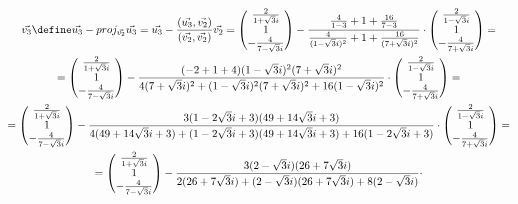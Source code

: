 \begin{multline*}
    \vec{v_3} \define \vec{u_3} - proj_{\vec{v_2}}\vec{u_3} = \vec{u_3} - \frac{(\vec{u_3}, \vec{v_2})}{(\vec{v_2}, \vec{v_2})}\vec{v_2} =
    \begin{pmatrix}
        \frac2{1 + \sqrt3i} \\
        1 \\
        -\frac4{7 - \sqrt3i}
    \end{pmatrix} - \frac{\frac4{1 - 3} + 1 + \frac{16}{7 - 3}}{\frac4{(1 - \sqrt3i)^2} + 1 + \frac{16}{(7 + \sqrt3i)^2}} \cdot
    \begin{pmatrix}
        \frac2{1 - \sqrt3i} \\
        1 \\
        -\frac4{7 + \sqrt3i}
    \end{pmatrix} = \\
    =
    \begin{pmatrix}
        \frac2{1 + \sqrt3i} \\
        1 \\
        -\frac4{7 - \sqrt3i}
    \end{pmatrix} - \frac{(-2 + 1 + 4)(1 - \sqrt3i)^2(7 + \sqrt3i)^2}{4(7 + \sqrt3i)^2 + (1 - \sqrt3i)^2(7 + \sqrt3i)^2 + 16(1 - \sqrt3i)^2} \cdot
    \begin{pmatrix}
        \frac2{1 - \sqrt3i} \\
        1 \\
        -\frac4{7 + \sqrt3i}
    \end{pmatrix} = \\
    =
    \begin{pmatrix}
        \frac2{1 + \sqrt3i} \\
        1 \\
        -\frac4{7 - \sqrt3i}
    \end{pmatrix} - \frac{3(1 - 2\sqrt3i + 3)(49 + 14\sqrt3i + 3)}{4(49 + 14\sqrt3i + 3) + (1 - 2\sqrt3i + 3)(49 + 14\sqrt3i + 3) + 16(1 - 2\sqrt3i + 3)} \cdot
    \begin{pmatrix}
        \frac2{1 - \sqrt3i} \\
        1 \\
        -\frac4{7 + \sqrt3i}
    \end{pmatrix} = \\
    =
    \begin{pmatrix}
        \frac2{1 + \sqrt3i} \\
        1 \\
        -\frac4{7 - \sqrt3i}
    \end{pmatrix} - \frac{3(2 - \sqrt3i)(26 + 7\sqrt3i)}{2(26 + 7\sqrt3i) + (2 - \sqrt3i)(26 + 7\sqrt3i) + 8(2 - \sqrt3i)} \cdot

\end{multline*}
